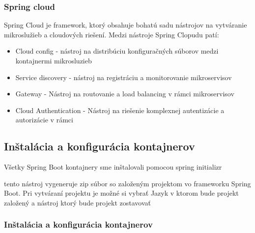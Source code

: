   

  

  

\subsubsection{Spring cloud} 

 Spring Cloud je framework, ktorý obsahuje bohatú sadu nástrojov na vytváranie mikroslužieb a cloudových riešení. Medzi nástroje Spring Clopudu patí:  

\begin{itemize} 

\item Cloud config - nástroj na distribúciu konfiguračných súborov medzi kontajnermi mikrosluzieb

\item Service discovery - nástroj na registráciu a monitorovanie mikroservisov 

\item Gateway - Nástroj na routovanie a load balancing v rámci mikroservisov 

\item Cloud Authentication - Nástroj na riešenie komplexnej autentizácie a autorizácie v rámci 

\end{itemize} 

  

  

  

\subsection{Inštalácia a konfigurácia kontajnerov} 

 Všetky Spring Boot kontajnery sme inštalovali pomocou spring initializr 


tento nástroj vygeneruje zip súbor so založeným projektom vo frameworku Spring Boot. Pri vytváraní projektu je možné si vybrať Jazyk v ktorom bude projekt založený a nástroj ktorý bude projekt zostavovať %

\subsubsection{Inštalácia a konfigurácia kontajnerov} 

  

 

  

